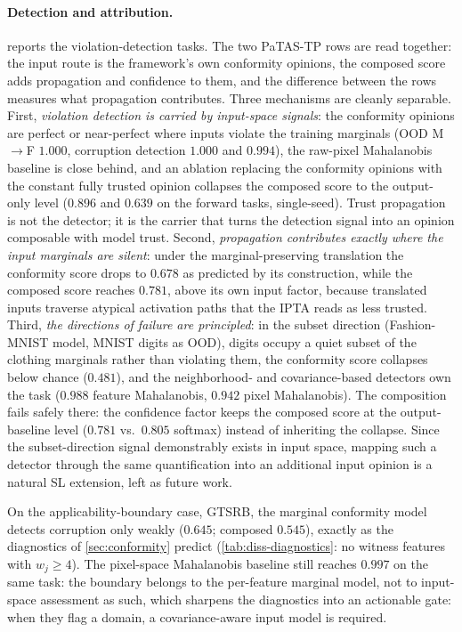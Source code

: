 \paragraph*{Detection and attribution.}
 reports the violation-detection tasks. The two \ac{PaTAS-TP} rows are read together: the input route is the framework's own conformity opinions, the composed score adds propagation and confidence to them, and the difference between the rows measures what propagation contributes. Three mechanisms are cleanly separable. First, \emph{violation detection is carried by input-space signals}: the conformity opinions are perfect or near-perfect where inputs violate the training marginals (\ac{OOD} M$\to$F $1.000$, corruption detection $1.000$ and $0.994$), the raw-pixel Mahalanobis baseline is close behind, and an ablation replacing the conformity opinions with the constant fully trusted opinion collapses the composed score to the output-only level ($0.896$ and $0.639$ on the forward tasks, single-seed). Trust propagation is not the detector; it is the carrier that turns the detection signal into an opinion composable with model trust. Second, \emph{propagation contributes exactly where the input marginals are silent}: under the marginal-preserving translation the conformity score drops to $0.678$ as predicted by its construction, while the composed score reaches $0.781$, above its own input factor, because translated inputs traverse atypical activation paths that the \ac{IPTA} reads as less trusted. Third, \emph{the directions of failure are principled}: in the subset direction (Fashion-MNIST model, MNIST digits as \ac{OOD}), digits occupy a quiet subset of the clothing marginals rather than violating them, the conformity score collapses below chance ($0.481$), and the neighborhood- and covariance-based detectors own the task ($0.988$ feature Mahalanobis, $0.942$ pixel Mahalanobis). The composition fails safely there: the confidence factor keeps the composed score at the output-baseline level ($0.781$ vs.\ $0.805$ softmax) instead of inheriting the collapse. Since the subset-direction signal demonstrably exists in input space, mapping such a detector through the same quantification into an additional input opinion is a natural \ac{SL} extension, left as future work.

On the applicability-boundary case, GTSRB, the marginal conformity model detects corruption only weakly ($0.645$; composed $0.545$), exactly as the diagnostics of \cref{sec:conformity} predict (\cref{tab:diss-diagnostics}: no witness features with $w_j \geq 4$). The pixel-space Mahalanobis baseline still reaches $0.997$ on the same task: the boundary belongs to the per-feature marginal model, not to input-space assessment as such, which sharpens the diagnostics into an actionable gate: when they flag a domain, a covariance-aware input model is required.

